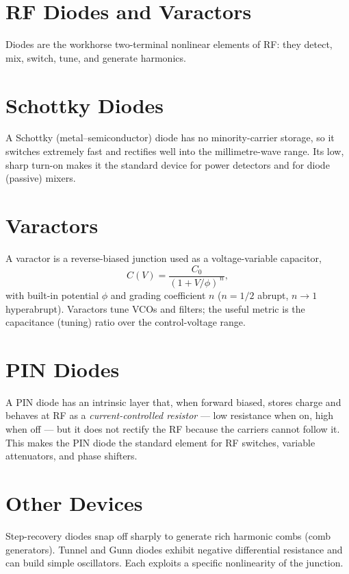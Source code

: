 \section{RF Diodes and Varactors}\label{sec:tb_diodes}



Diodes are the workhorse two-terminal nonlinear elements of RF: they detect,
mix, switch, tune, and generate harmonics.

\section{Schottky Diodes}
A Schottky (metal--semiconductor) diode has no minority-carrier storage, so it
switches extremely fast and rectifies well into the millimetre-wave range. Its
low, sharp turn-on makes it the standard device for power detectors and for
diode (passive) mixers.

\section{Varactors}
A varactor is a reverse-biased junction used as a voltage-variable capacitor,
\[ C(V) = \frac{C_0}{(1 + V/\phi)^{\,n}}, \]
with built-in potential $\phi$ and grading coefficient $n$ ($n=1/2$ abrupt,
$n\!\to\!1$ hyperabrupt). Varactors tune VCOs and filters; the useful metric is the
capacitance (tuning) ratio over the control-voltage range.

\section{PIN Diodes}
A PIN diode has an intrinsic layer that, when forward biased, stores charge and
behaves at RF as a \emph{current-controlled resistor} --- low resistance when on,
high when off --- but it does not rectify the RF because the carriers cannot
follow it. This makes the PIN diode the standard element for RF switches,
variable attenuators, and phase shifters.

\section{Other Devices}
Step-recovery diodes snap off sharply to generate rich harmonic combs (comb
generators). Tunnel and Gunn diodes exhibit negative differential resistance and
can build simple oscillators. Each exploits a specific nonlinearity of the
junction.



